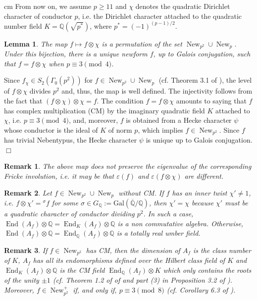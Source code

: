 \documentclass[a4paper,12pt]{article}
\newtheorem{lema}{Lemma}%
\newtheorem{rem}{Remark}%
\theoremstyle{definition}
\theoremstyle{remark}
\numberwithin{equation}{section}
\newcommand{\Q}{\mathbb{Q}}
\newcommand{\Gal}{\mathrm{Gal}}
\newcommand{\End}{\operatorname{End}}
\newcommand{\New}{\operatorname{New}}
\begin{document}
 cm
 From now on, we assume  $p\geq 11$ and   $\chi$  denotes the  quadratic Dirichlet character of conductor $p$, i.e. the Dirichlet character  attached to the quadratic number field  $K=\Q(\sqrt{p^*})$, where $p^*=(-1)^{(p-1)/2}$.
\begin{lema} The map $f\mapsto f\otimes \chi$ is a permutation of the set $\New_{p^2}\cup\New_p$. Under this bijection, there is a unique newform $f$, up to Galois conjugation, such that $f=f\otimes \chi$ when $p\equiv 3 \pmod 4$.

\end{lema}
  Since    $f_\chi\in S_2(\Gamma_0(p^2))$ for $f\in\New_{p^2}\cup\New_p$ (cf. Theorem 3.1 of \cite{Atkin}),   the level of $f\otimes\chi$ divides $p^2$ and, thus, the map  is well defined. The injectivity follows from the fact that $(f\otimes\chi)\otimes\chi=f$.
The condition $f=f\otimes\chi$  amounts to saying that $f$ has complex multiplication (CM)  by the imaginary quadratic field $K$ attached to $\chi$, i.e. $p\equiv 3 \pmod 4$,  and, moreover, $f$ is obtained from a Hecke character $\psi$ whose  conductor is the ideal of $K$ of norm $p$, which implies  $f\in\New_{p^2}$. Since $f$ has trivial Nebentypus, the Hecke character $\psi$ is unique up to Galois conjugation.
\hfill $\Box$

\begin{rem} The above map does not preserve the eigenvalue of the corresponding Fricke involution, i.e.   it may be that  $\varepsilon(f)$ and $\varepsilon(f\otimes \chi)$ are different.
\end{rem}

\begin{rem} Let $f \in \New_{p^2}\cup \New_p$ without CM. If $f$ has an inner twist $\chi'\neq 1$, i.e. $f\otimes \chi'={}^{\sigma} f$ for some $\sigma\in G_\Q:=\Gal (\overline{\Q}/\Q)$, then $\chi'=\chi$ because $\chi'$ must be a quadratic character of conductor dividing $p^2$.
In such a  case,  $\End (A_f)\otimes\Q=\End_K(A_f)\otimes \Q$ is a non commutative algebra. Otherwise, $\End (A_f)\otimes\Q=\End_\Q(A_f)\otimes \Q$ is a totally real umber field.

\end{rem}
\begin{rem} If $f\in\New_{p^2}$ has CM, then the dimension of $A_f$ is the class   number of $K$, $A_f$ has all its endomorphisms defined over the Hilbert class field of $K$ and $\End_K(A_f)\otimes\Q$ is the CM field $\End_\Q(A_f)\otimes K$ which only contains the roots of the unity $\pm 1$ (cf. Theorem 1.2 of  of  \cite{gola011} and part (3) in Proposition 3.2 of \cite{Yang2}). Moreover, $f\in\New_{p^2}^+$ if, and only if, $p\equiv 3\pmod 8$ (cf. Corollary 6.3 of \cite{Yang1}).

\end{rem}
\end{document}
